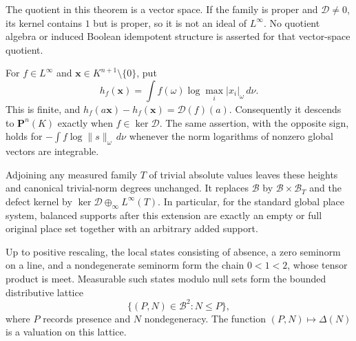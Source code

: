 The quotient in this theorem is a vector space. If the family is proper
and $\mathcal D\ne0$, its kernel contains $1$ but is proper, so it is not an
ideal of $L^\infty$. No quotient algebra or induced Boolean idempotent
structure is asserted for that vector-space quotient.

\begin{proposition}
\label{prop:height-neutrality}
For $f\in L^\infty$ and $\mathbf x\in K^{n+1}\setminus\{0\}$, put
\[
 h_f(\mathbf x)=\int f(\omega)\log\max_i|x_i|_\omega\,d\nu.
\]
This is finite, and
$h_f(a\mathbf x)-h_f(\mathbf x)=\mathcal D(f)(a)$.
Consequently it descends to $\mathbf P^n(K)$ exactly when
$f\in\ker\mathcal D$. The same assertion, with the opposite sign,
holds for $-\int f\log\|s\|_\omega\,d\nu$ whenever the norm logarithms
of nonzero global vectors are integrable.

Adjoining any measured family $T$ of trivial absolute values leaves these
heights and canonical trivial-norm degrees unchanged. It replaces
$\mathcal B$ by $\mathcal B\times\mathcal B_T$ and the defect kernel by
$\ker\mathcal D\oplus_\infty L^\infty(T)$. In particular, for the standard
global place system, balanced supports after this extension are exactly
an empty or full original place set together with an arbitrary added
support.

Up to positive rescaling, the local states consisting of absence, a zero
seminorm on a line, and a nondegenerate seminorm form the chain
$0<1<2$, whose tensor product is meet. Measurable such states modulo null
sets form the bounded distributive lattice
\[
 \{(P,N)\in\mathcal B^2:N\le P\},
\]
where $P$ records presence and $N$ nondegeneracy. The function
$(P,N)\mapsto\Delta(N)$ is a valuation on this lattice.
\end{proposition}
